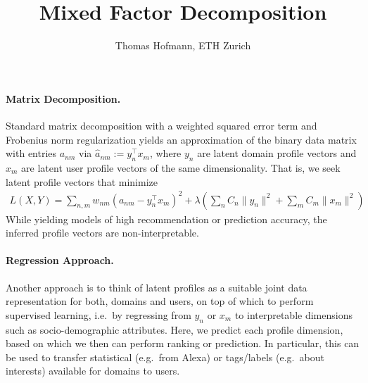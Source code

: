 \documentclass{article}
\title{Mixed Factor Decomposition}
\author{Thomas Hofmann, ETH Zurich}
\begin{document}
\maketitle 

\paragraph{Matrix Decomposition.} Standard matrix decomposition with a weighted squared error term and Frobenius norm regularization yields an approximation of the binary data matrix with entries $a_{nm}$ via  $\hat a_{nm} := y_n^\top x_m $, where $y_n$ are latent domain profile vectors and $x_m$ are latent user profile vectors of the same dimensionality. That is, we seek latent profile vectors that minimize 
\begin{align}
L(X,Y) = \sum_{n,m} w_{nm} ( a_{nm} - y_n^\top x_m)^2 
+ \lambda \left( 	\sum_n C_n \| y_n\|^2  + \sum_m C_m \| x_m\|^2 \right) 
\end{align}
While yielding models of high recommendation or prediction accuracy, the inferred profile vectors are non-interpretable. 

\paragraph{Regression Approach.} Another approach is to think of latent profiles as a suitable joint data representation for both, domains and users, on top of which to perform supervised learning, i.e.~by regressing from $y_n$ or $x_m$ to interpretable dimensions such as socio-demographic attributes. Here, we predict each profile dimension, based on which we then can perform ranking or prediction.  In particular, this can be used to transfer statistical (e.g.~from Alexa) or tags/labels (e.g.~about interests)  available for domains to users. 
\end{document}
